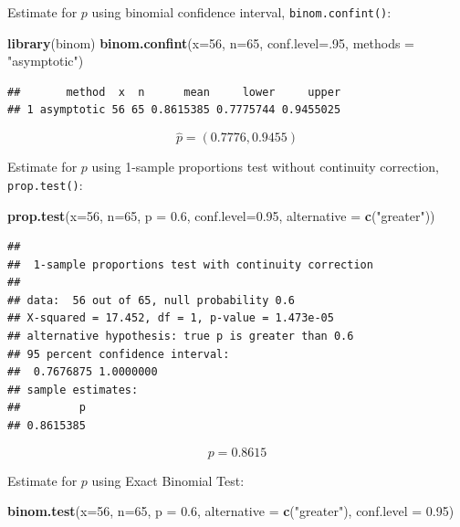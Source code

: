 \documentclass[]{article}
\newenvironment{Shaded}{\begin{snugshade}}{\end{snugshade}}
\newcommand{\DataTypeTok}[1]{\textcolor[rgb]{0.13,0.29,0.53}{#1}}
\newcommand{\DecValTok}[1]{\textcolor[rgb]{0.00,0.00,0.81}{#1}}
\newcommand{\FloatTok}[1]{\textcolor[rgb]{0.00,0.00,0.81}{#1}}
\newcommand{\KeywordTok}[1]{\textcolor[rgb]{0.13,0.29,0.53}{\textbf{#1}}}
\newcommand{\NormalTok}[1]{#1}
\newcommand{\StringTok}[1]{\textcolor[rgb]{0.31,0.60,0.02}{#1}}
\begin{document}
Estimate for \(p\) using binomial confidence interval,
\texttt{binom.confint()}:

\begin{Shaded}
\begin{Highlighting}[]
\KeywordTok{library}\NormalTok{(binom)}
\KeywordTok{binom.confint}\NormalTok{(}\DataTypeTok{x=}\DecValTok{56}\NormalTok{, }\DataTypeTok{n=}\DecValTok{65}\NormalTok{, }\DataTypeTok{conf.level=}\NormalTok{.}\DecValTok{95}\NormalTok{, }\DataTypeTok{methods =} \StringTok{"asymptotic"}\NormalTok{)}
\end{Highlighting}
\end{Shaded}

\begin{verbatim}
##       method  x  n      mean     lower     upper
## 1 asymptotic 56 65 0.8615385 0.7775744 0.9455025
\end{verbatim}

\[
    \hat{p} = (0.7776, 0.9455)
\]

Estimate for \(p\) using 1-sample proportions test without continuity
correction, \texttt{prop.test()}:

\begin{Shaded}
\begin{Highlighting}[]
\KeywordTok{prop.test}\NormalTok{(}\DataTypeTok{x=}\DecValTok{56}\NormalTok{, }\DataTypeTok{n=}\DecValTok{65}\NormalTok{, }\DataTypeTok{p =} \FloatTok{0.6}\NormalTok{, }\DataTypeTok{conf.level=}\FloatTok{0.95}\NormalTok{, }\DataTypeTok{alternative =} \KeywordTok{c}\NormalTok{(}\StringTok{"greater"}\NormalTok{))}
\end{Highlighting}
\end{Shaded}

\begin{verbatim}
## 
##  1-sample proportions test with continuity correction
## 
## data:  56 out of 65, null probability 0.6
## X-squared = 17.452, df = 1, p-value = 1.473e-05
## alternative hypothesis: true p is greater than 0.6
## 95 percent confidence interval:
##  0.7676875 1.0000000
## sample estimates:
##         p 
## 0.8615385
\end{verbatim}

\[
    p = 0.8615
\]

Estimate for \(p\) using Exact Binomial Test:

\begin{Shaded}
\begin{Highlighting}[]
\KeywordTok{binom.test}\NormalTok{(}\DataTypeTok{x=}\DecValTok{56}\NormalTok{, }\DataTypeTok{n=}\DecValTok{65}\NormalTok{, }\DataTypeTok{p =} \FloatTok{0.6}\NormalTok{, }\DataTypeTok{alternative =} \KeywordTok{c}\NormalTok{(}\StringTok{"greater"}\NormalTok{), }\DataTypeTok{conf.level =} \FloatTok{0.95}\NormalTok{)}
\end{Highlighting}
\end{Shaded}
\end{document}
